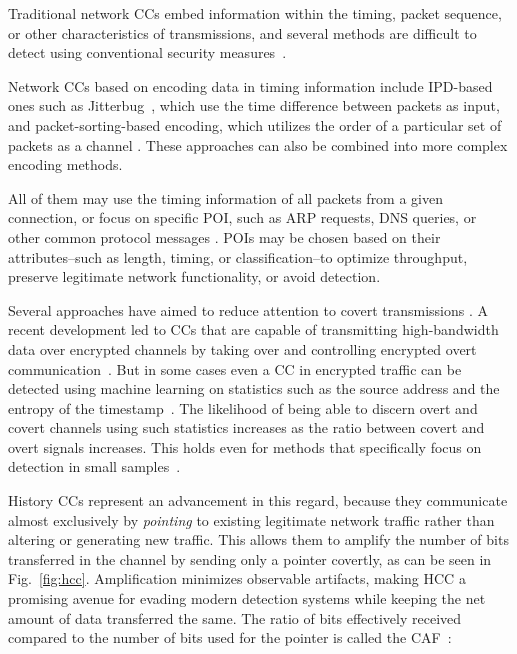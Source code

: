 \documentclass[journal]{IEEEtran}
\begin{document}
Traditional network \ac{CC}s embed information within the timing, packet sequence, or other characteristics of transmissions, and several methods are difficult to detect using conventional security measures~\cite{mileva14,wendzelpatternsurvey15,Iglesias2017Are,wang2016dwt,NIHBook,epskappa24}.

Network \ac{CC}s based on encoding data in timing information include \ac{IPD}-based ones such as Jitterbug~\cite{jitterbug16}, which use the time difference between packets as input, and packet-sorting-based encoding, which utilizes the order of a particular set of packets as a channel \cite{wendzelpatternsurvey15,cabuk04}. These approaches can also be combined into more complex encoding methods.

All of them may use the timing information of all packets from a given connection, or focus on specific \ac{POI}, such as \ac{ARP} requests, DNS queries, or other common protocol messages \cite{wendzelpatternsurvey15}.  \ac{POI}s may be chosen based on their attributes--such as length, timing, or classification--to optimize throughput, preserve legitimate network functionality, or avoid detection.

Several approaches have aimed to reduce attention to covert transmissions \cite{NIHBook,wendzelLowAttention}. A recent development led to \ac{CC}s that are capable of transmitting high-bandwidth data over encrypted channels by taking over and controlling encrypted overt communication~\cite{cckex24}. But in some cases even a \ac{CC} in encrypted traffic can be detected using machine learning on statistics such as the source address and the entropy of the timestamp~\cite{ai24,morepackets21,Ondov2022Covert,Epishkina2019Timing}. The likelihood of being able to discern overt and covert channels using such statistics increases as the ratio between covert and overt signals increases. This holds even for methods that specifically focus on detection in small samples~\cite{GAS22}.

History \ac{CC}s represent an advancement in this regard, because they communicate almost exclusively by \emph{pointing} to existing legitimate network traffic rather than altering or generating new traffic. This allows them to amplify the number of bits transferred in the channel by sending only a pointer covertly, as can be seen in Fig.~\ref{fig:hcc}. Amplification minimizes observable artifacts, making \ac{HCC} a promising avenue for evading modern detection systems while keeping the net amount of data transferred the same. The ratio of bits effectively received compared to the number of bits used for the pointer is called the \ac{CAF}~\cite{DYST22}:
\end{document}
